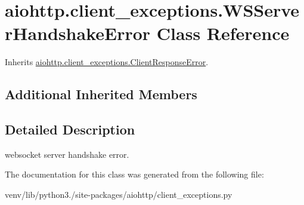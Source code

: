 \hypertarget{classaiohttp_1_1client__exceptions_1_1_w_s_server_handshake_error}{}\section{aiohttp.\+client\+\_\+exceptions.\+W\+S\+Server\+Handshake\+Error Class Reference}
\label{classaiohttp_1_1client__exceptions_1_1_w_s_server_handshake_error}


Inherits \hyperlink{classaiohttp_1_1client__exceptions_1_1_client_response_error}{aiohttp.\+client\+\_\+exceptions.\+Client\+Response\+Error}.

\subsection*{Additional Inherited Members}


\subsection{Detailed Description}
\begin{DoxyVerb}websocket server handshake error.\end{DoxyVerb}
 

The documentation for this class was generated from the following file\+:\begin{DoxyCompactItemize}
\item 
venv/lib/python3./site-\/packages/aiohttp/client\+\_\+exceptions.\+py\end{DoxyCompactItemize}
